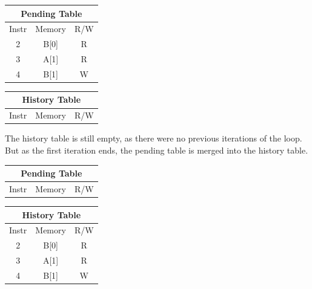 \documentclass[12pt,twoside]{reedthesis}
\begin{document}
		
		\begin{minipage}{1.0\linewidth}
		\begin{minipage}[t]{.5\linewidth}
				
		\begin{tabular}{ |c|c|c| } 
			\hline
			\multicolumn{3}{|c|}{Pending Table} \\
			\hline
			Instr & Memory & R/W \\ 
			\hline
			2 & B[0] & R \\ 
			3 & A[1] & R \\ 
			4 & B[1] & W \\ 
			\hline
		\end{tabular}
		\end{minipage}%
		\begin{minipage}[t]{.5\linewidth}
		\begin{tabular}[b]{ |c|c|c| } 
			\hline
			\multicolumn{3}{|c|}{History Table} \\
			\hline
			Instr & Memory & R/W \\ 
			\hline
			\hline
		\end{tabular}
		\end{minipage}
		\end{minipage}
		
		The history table is still empty, as there were no previous iterations of the loop. But as the first iteration ends, the pending table is merged into the history table. 
		
		
		\begin{minipage}{1.0\linewidth}
		\begin{minipage}[t]{.5\linewidth}
		
		\begin{tabular}[b]{ |c|c|c| } 
			\hline
			\multicolumn{3}{|c|}{Pending Table} \\
			\hline
			Instr & Memory & R/W \\ 
			\hline
			\hline
		\end{tabular}
		\end{minipage}%
		\begin{minipage}[t]{.5\linewidth}
		\begin{tabular}{ |c|c|c| } 
			\hline
			\multicolumn{3}{|c|}{History Table} \\
			\hline
			Instr & Memory & R/W \\ 
			\hline
			2 & B[0] & R \\ 
			3 & A[1] & R \\ 
			4 & B[1] & W \\ 
			\hline
		\end{tabular}
		\end{minipage}
	\end{minipage}
		
\end{document}
